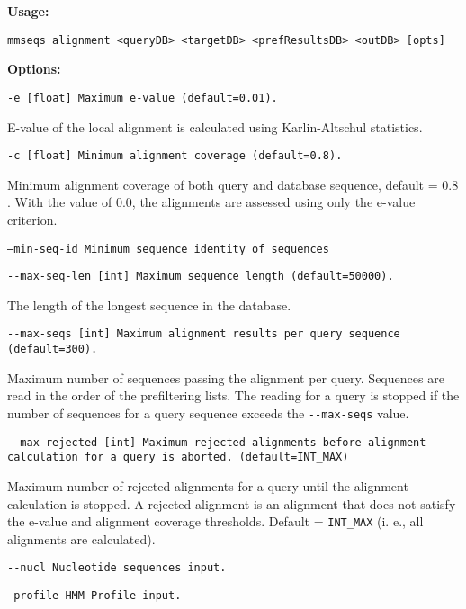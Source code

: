 \documentclass[11pt,a4paper]{report}
\begin{document}
\textbf{Usage:}

\texttt{mmseqs alignment <queryDB> <targetDB> <prefResultsDB> <outDB>
{[}opts{]}}

\textbf{Options:}

\texttt{\small -e {[}float{]} Maximum e-value (default=0.01).}{\small \par}

E-value of the local alignment is calculated using Karlin-Altschul
statistics.

\texttt{\small -c {[}float{]} Minimum alignment coverage (default=0.8).}{\small \par}

Minimum alignment coverage of both query and database sequence, default
= $0.8$. With the value of $0.0$, the alignments are assessed using
only the e-value criterion.

\texttt{\small --min-seq-id Minimum sequence identity of sequences}{\small \par}


\texttt{\small -{}-max-seq-len {[}int{]} Maximum sequence length (default=50000).}{\small \par}

The length of the longest sequence in the database.

\texttt{\small -{}-max-seqs {[}int{]} Maximum alignment results per
query sequence (default=300).}{\small \par}

Maximum number of sequences passing the alignment per query. Sequences
are read in the order of the prefiltering lists. The reading for a
query is stopped if the number of sequences for a query sequence exceeds
the \texttt{-{}-max-seqs} value.

\texttt{\small -{}-max-rejected {[}int{]} Maximum rejected alignments
before alignment calculation for a query is aborted. (default=INT\_MAX)}{\small \par}

Maximum number of rejected alignments for a query until the alignment
calculation is stopped. A rejected alignment is an alignment that
does not satisfy the e-value and alignment coverage thresholds. Default
= \texttt{INT\_MAX} (i. e., all alignments are calculated).

\texttt{\small -{}-nucl Nucleotide sequences input.}{\small \par}

\texttt{\small --profile HMM Profile input.}{\small \par}
\end{document}
